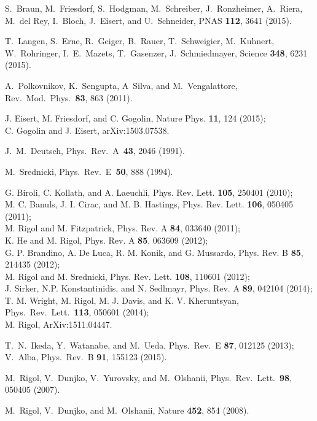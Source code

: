 \documentclass[11pt]{iopart}
\begin{document}
\begin{thebibliography}{99}
S.~Braun, M.~Friesdorf, S.~Hodgman, M.~Schreiber, J.~Ronzheimer, A.~Riera, M.~del Rey,
I.~Bloch, J.~Eisert, and U.~Schneider, PNAS {\bf 112}, 3641 (2015).


T.~Langen, S.~Erne, R.~Geiger, B.~Rauer, T.~Schweigier, M.~Kuhnert, W.~Rohringer,
I.~E.~Mazets, T.~Gasenzer, J.~Schmiedmayer, Science {\bf 348}, 6231 (2015).



A.~Polkovnikov, K.~Sengupta, A~Silva, and M.~Vengalattore, Rev.\ Mod.\ Phys.\
{\bf 83}, 863 (2011).


J. Eisert, M. Friesdorf, and C. Gogolin, Nature Phys. {\bf 11}, 124 (2015);\\
C. Gogolin and J. Eisert,  arXiv:1503.07538.


J.~M.~Deutsch, Phys.\ Rev.\ A\ {\bf 43}, 2046 (1991).


M.~Srednicki, Phys.\ Rev.\ E\ {\bf 50}, 888 (1994).


G. Biroli, C. Kollath, and A. Laeuchli, Phys. Rev. Lett. {\bf 105}, 250401 (2010);\\
M. C. Banuls, J. I. Cirac, and M. B. Hastings, Phys. Rev. Lett. {\bf 106}, 050405 (2011);\\
M. Rigol and M. Fitzpatrick, Phys. Rev. A {\bf 84}, 033640 (2011);\\
K. He and M. Rigol, Phys. Rev. A {\bf 85}, 063609 (2012);\\
G. P. Brandino, A. De Luca, R. M. Konik, and G. Mussardo, Phys. Rev. B {\bf 85}, 214435 (2012);\\
M. Rigol and  M. Srednicki,  Phys. Rev. Lett. {\bf 108}, 110601 (2012);\\
J. Sirker, N.P. Konstantinidis, and N. Sedlmayr, Phys. Rev. A {\bf 89}, 042104 (2014);\\
T. M. Wright, M. Rigol, M. J. Davis, and K. V. Kheruntsyan, Phys.\ Rev.\ Lett.\ {\bf 113},  050601 (2014);\\
M. Rigol, ArXiv:1511.04447. 


T.~N.~Ikeda, Y.~Watanabe, and M.~Ueda, Phys.\ Rev.\ E {\bf 87}, 012125 (2013);\\
V.~Alba, Phys.\ Rev.\ B {\bf 91}, 155123 (2015). 


M.~Rigol, V.~Dunjko, V.~Yurovsky, and M.~Olshanii, Phys.\ Rev.\ Lett.\ 
{\bf 98}, 050405 (2007). 


M.~Rigol, V.~Dunjko, and M.~Olshanii, Nature {\bf 452}, 854 (2008). 




\end{thebibliography}
\end{document}
